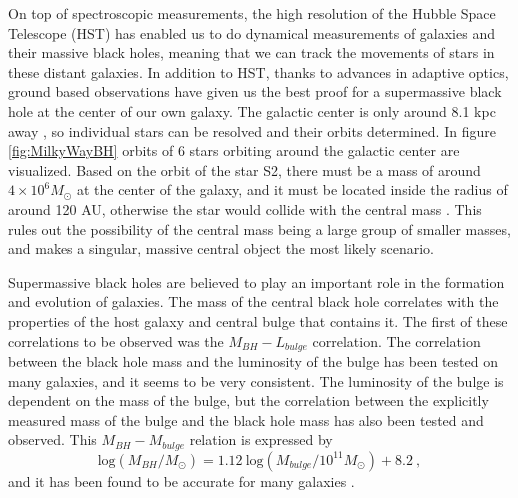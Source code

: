 \documentclass[english, oneside]{HYgradu}
\begin{document}
On top of spectroscopic measurements, the high resolution of the Hubble Space Telescope (HST) has enabled us to do dynamical measurements of galaxies and their massive black holes, meaning that we can track the movements of stars in these distant galaxies. In addition to HST, thanks to advances in adaptive optics, ground based observations have given us the best proof for a supermassive black hole at the center of our own galaxy. The galactic center is only around 8.1 kpc away \citep{eisenhauer:2018}, so individual stars can be resolved and their orbits determined. In figure \ref{fig:MilkyWayBH} orbits of 6 stars orbiting around the galactic center are visualized. Based on the orbit of the star S2, there must be a mass of around $4 \times 10^6 M_\odot$ at the center of the galaxy, and it must be located inside the radius of around 120 AU, otherwise the star would collide with the central mass \citep{kormendy:2013}. This rules out the possibility of the central mass being a large group of smaller masses, and makes a singular, massive central object the most likely scenario.

Supermassive black holes are believed to play an important role in the formation and evolution of galaxies. The mass of the central black hole correlates with the properties of the host galaxy and central bulge that contains it. The first of these correlations to be observed was the $M_{BH} - L_{bulge}$ correlation. The correlation between the black hole mass and the luminosity of the bulge has been tested on many galaxies, and it seems to be very consistent. The luminosity of the bulge is dependent on the mass of the bulge, but the correlation between the explicitly measured mass of the bulge and the black hole mass has also been tested and observed. This $M_{BH} - M_{bulge}$ relation is expressed by
\begin{equation}
\mathrm{log} (M_{BH}/M_{\odot}) = 1.12 \  \mathrm{log} (M_{bulge}/ 10^{11} M_{\odot}) + 8.2 \ ,
\end{equation}
and it has been found to be accurate for many galaxies \citep{haring:2004}.
\end{document}
